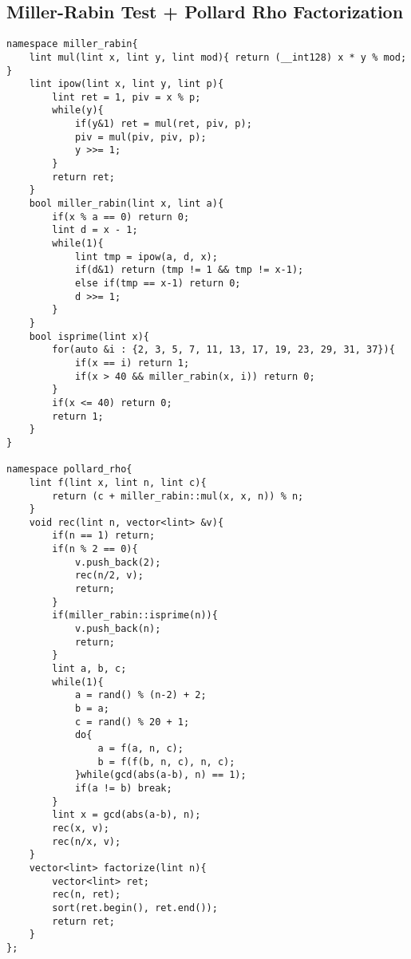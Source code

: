 \documentclass[landscape, 8pt, a4paper, oneside, twocolumn]{extarticle}
\begin{document}
\subsection{Miller-Rabin Test + Pollard Rho Factorization}
\begin{verbatim}
namespace miller_rabin{
    lint mul(lint x, lint y, lint mod){ return (__int128) x * y % mod; }
	lint ipow(lint x, lint y, lint p){
		lint ret = 1, piv = x % p;
		while(y){
			if(y&1) ret = mul(ret, piv, p);
			piv = mul(piv, piv, p);
			y >>= 1;
		}
		return ret;
	}
	bool miller_rabin(lint x, lint a){
		if(x % a == 0) return 0;
		lint d = x - 1;
		while(1){
			lint tmp = ipow(a, d, x);
			if(d&1) return (tmp != 1 && tmp != x-1);
			else if(tmp == x-1) return 0;
			d >>= 1;
		}
	}
	bool isprime(lint x){
		for(auto &i : {2, 3, 5, 7, 11, 13, 17, 19, 23, 29, 31, 37}){
			if(x == i) return 1;
			if(x > 40 && miller_rabin(x, i)) return 0;
		}
		if(x <= 40) return 0;
		return 1;
	}
}

namespace pollard_rho{
	lint f(lint x, lint n, lint c){
		return (c + miller_rabin::mul(x, x, n)) % n;
	}
	void rec(lint n, vector<lint> &v){
		if(n == 1) return;
		if(n % 2 == 0){
			v.push_back(2);
			rec(n/2, v);
			return;
		}
		if(miller_rabin::isprime(n)){
			v.push_back(n);
			return;
		}
		lint a, b, c;
		while(1){
			a = rand() % (n-2) + 2;
			b = a;
			c = rand() % 20 + 1;
			do{
				a = f(a, n, c);
				b = f(f(b, n, c), n, c);
			}while(gcd(abs(a-b), n) == 1);
			if(a != b) break;
		}
		lint x = gcd(abs(a-b), n);
		rec(x, v);
		rec(n/x, v);
	}
	vector<lint> factorize(lint n){
		vector<lint> ret;
		rec(n, ret);
		sort(ret.begin(), ret.end());
		return ret;
	}
};
\end{verbatim}
\end{document}
